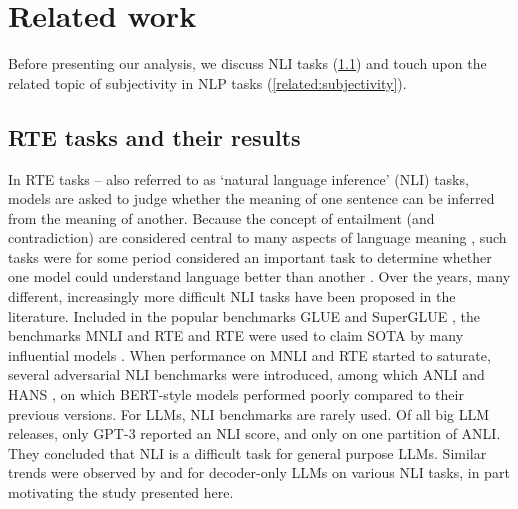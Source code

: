 \section{Related work}

Before presenting our analysis, we discuss NLI tasks (\cref{related:nli}) and touch upon the related topic of subjectivity in NLP tasks (\cref{related:subjectivity}).

\subsection{RTE tasks and their results}
\label{related:nli}

In RTE tasks -- also referred to as `natural language inference' (NLI) tasks, models are asked to judge whether the meaning of one sentence can be inferred from the meaning of another.
Because the concept of entailment (and contradiction) are considered central to many aspects of language meaning \citep[e.g.][]{bowman-etal-2015-large}, such tasks were for some period considered an important task to determine whether one model could understand language better than another \citep{poliak-2020-survey}.
Over the years, many different, increasingly more difficult NLI tasks have been proposed in the literature.
Included in the popular benchmarks GLUE \citep{wang2019glue} and SuperGLUE \citep{wang2019superglue}, the benchmarks MNLI \citep{williams-etal-2018-broad} and RTE \citep{dagan2005pascal} and RTE were used to claim SOTA by many influential models \citep[e.g.][]{raffel2023t5,devlin2019BERT}.
When performance on MNLI and RTE started to saturate, several adversarial NLI benchmarks were introduced, among which ANLI \citep{raffel2023t5} and HANS \citep{mccoy-etal-2019-right}, on which BERT-style models performed poorly compared to their previous versions.
For LLMs, NLI benchmarks are rarely used.
Of all big LLM releases, only GPT-3 \citep{brown2020language} reported an NLI score, and only on one partition of ANLI.
They concluded that NLI is a difficult task for general purpose LLMs.
Similar trends were observed by \citet{ohmer2024form} and \citet{weber-etal-2023-mind} for decoder-only LLMs on various NLI tasks, in part motivating the study presented here.

